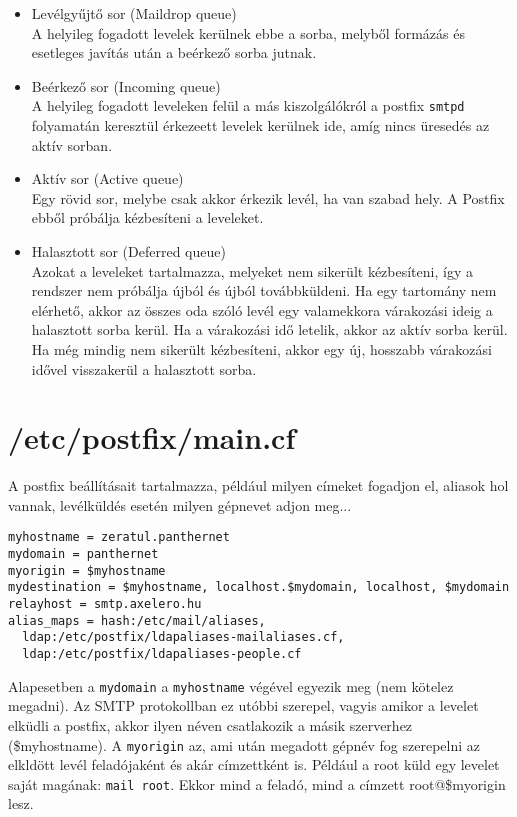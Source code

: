 \begin{itemize}
  \item Levélgyűjtő sor (Maildrop queue)\\
    A helyileg fogadott levelek kerülnek ebbe a sorba, melyből formázás és esetleges javítás után a beérkező sorba
    jutnak.
  \item  Beérkező sor (Incoming queue)\\
    A helyileg fogadott leveleken felül a más kiszolgálókról a postfix \texttt{smtpd} folyamatán keresztül érkezeett
    levelek kerülnek ide, amíg nincs üresedés az aktív sorban.
  \item Aktív sor (Active queue)\\
    Egy rövid sor, melybe csak akkor érkezik levél, ha van szabad hely. A Postfix ebből próbálja kézbesíteni a
    leveleket.
  \item Halasztott sor (Deferred queue)\\
    Azokat a leveleket tartalmazza, melyeket nem sikerült kézbesíteni, így a rendszer nem próbálja újból és újból
    továbbküldeni. Ha egy tartomány nem elérhető, akkor az összes oda szóló levél egy valamekkora várakozási ideig a
    halasztott sorba kerül. Ha a várakozási idő letelik, akkor az aktív sorba kerül. Ha még mindig nem sikerült
    kézbesíteni, akkor egy új, hosszabb várakozási idővel visszakerül a halasztott sorba.
\end{itemize}



\section{/etc/postfix/main.cf}
A postfix beállításait tartalmazza, például milyen címeket fogadjon el, aliasok hol vannak, levélküldés esetén milyen
gépnevet adjon meg...

\begin{Verbatim}[frame=single]
myhostname = zeratul.panthernet
mydomain = panthernet
myorigin = $myhostname
mydestination = $myhostname, localhost.$mydomain, localhost, $mydomain
relayhost = smtp.axelero.hu
alias_maps = hash:/etc/mail/aliases,
  ldap:/etc/postfix/ldapaliases-mailaliases.cf,
  ldap:/etc/postfix/ldapaliases-people.cf
\end{Verbatim}

Alapesetben a \texttt{mydomain} a \texttt{myhostname} végével egyezik meg (nem kötelez megadni). Az SMTP protokollban
ez utóbbi szerepel, vagyis amikor a levelet elküdli a postfix, akkor ilyen néven csatlakozik a másik szerverhez
(\$myhostname). A \texttt{myorigin} az, ami után megadott gépnév fog szerepelni az elkldött levél feladójaként és akár
címzettként is. Például a root küld egy levelet saját magának: \texttt{mail root}. Ekkor mind a feladó, mind a címzett
root@\$myorigin lesz.

